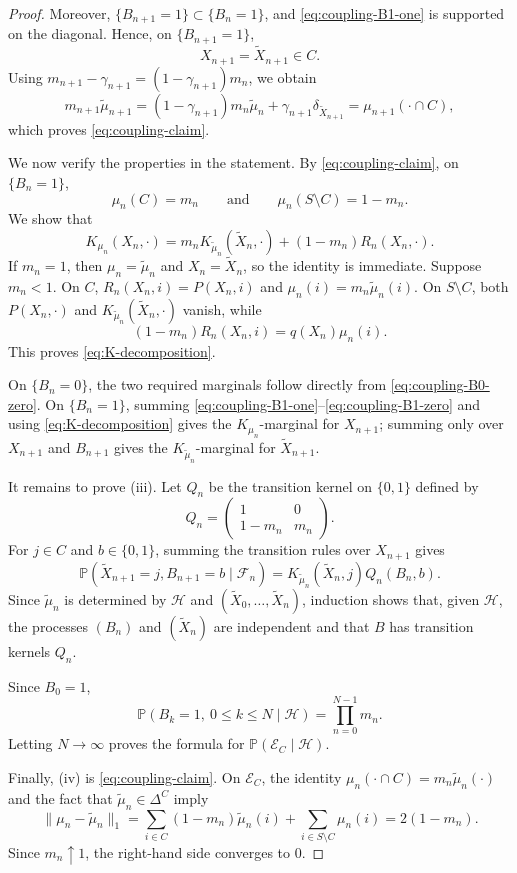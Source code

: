 \documentclass[10pt,letterpaper]{article}
\theoremstyle{compactplain}
\theoremstyle{compactdefinition}
\newcommand{\1}{\mathds{1}}
\begin{document}
\begin{proof}
Moreover,
\(\{B_{n+1}=1\}\subset\{B_n=1\}\), and
\eqref{eq:coupling-B1-one} is supported on the diagonal. Hence, on
\(\{B_{n+1}=1\}\),
\[
X_{n+1}=\widetilde X_{n+1}\in C.
\]
Using
\(m_{n+1}-\gamma_{n+1}=(1-\gamma_{n+1})m_n\), we obtain
\[
m_{n+1}\widetilde\mu_{n+1}
=
(1-\gamma_{n+1})m_n\widetilde\mu_n
+
\gamma_{n+1}\delta_{\widetilde X_{n+1}}
=
\mu_{n+1}(\cdot\cap C),
\] which proves \eqref{eq:coupling-claim}.

We now verify the properties in the statement. By \eqref{eq:coupling-claim}, on \(\{B_n=1\}\),
\[
\mu_n(C)=m_n
\qquad\text{and}\qquad
\mu_n(S\setminus C)=1-m_n.
\]
We show that
\begin{equation}
\label{eq:K-decomposition}
K_{\mu_n}(X_n,\cdot)
=
m_nK_{\widetilde\mu_n}(\widetilde X_n,\cdot)
+
(1-m_n)R_n(X_n,\cdot).
\end{equation}
If \(m_n=1\), then
\(\mu_n=\widetilde\mu_n\) and \(X_n=\widetilde X_n\), so the identity is
immediate. Suppose \(m_n<1\). On \(C\),
\(R_n(X_n,i)=P(X_n,i)\) and
\(\mu_n(i)=m_n\widetilde\mu_n(i)\). On \(S\setminus C\),
both \(P(X_n,\cdot)\) and
\(K_{\widetilde\mu_n}(\widetilde X_n,\cdot)\) vanish, while
\[
(1-m_n)R_n(X_n,i)=q(X_n)\mu_n(i).
\]
This proves \eqref{eq:K-decomposition}.

On \(\{B_n=0\}\), the two required marginals follow directly from
\eqref{eq:coupling-B0-zero}. On \(\{B_n=1\}\), summing
\eqref{eq:coupling-B1-one}--\eqref{eq:coupling-B1-zero} and using
\eqref{eq:K-decomposition} gives the \(K_{\mu_n}\)-marginal for
\(X_{n+1}\); summing only over \(X_{n+1}\) and \(B_{n+1}\) gives the
\(K_{\widetilde\mu_n}\)-marginal for \(\widetilde X_{n+1}\).

It remains to prove (iii). Let \(Q_n\) be the transition kernel on \(\{0,1\}\) defined by
\[
Q_n=
\begin{pmatrix}
1 & 0\\
1-m_n & m_n
\end{pmatrix}.
\]
For \(j\in C\) and \(b\in\{0,1\}\), summing the transition rules over
\(X_{n+1}\) gives
\[
\mathbb P(\widetilde X_{n+1}=j,B_{n+1}=b\mid\mathcal F_n)
=
K_{\widetilde\mu_n}(\widetilde X_n,j)Q_n(B_n,b).
\]
Since \(\widetilde\mu_n\) is determined by \(\mathcal H\) and
\((\widetilde X_0,\ldots,\widetilde X_n)\), induction shows that, given
\(\mathcal H\), the processes \((B_n)\) and \((\widetilde X_n)\) are
independent and that \(B\) has transition kernels \(Q_n\).

Since \(B_0=1\),
\[
\mathbb P(B_k=1,\ 0\leq k\leq N\mid\mathcal H)
=
\prod_{n=0}^{N-1}m_n.
\]
Letting \(N\to\infty\) proves the formula for
\(\mathbb P(\mathcal E_C\mid\mathcal H)\).

Finally, (iv) is \eqref{eq:coupling-claim}. On \(\mathcal E_C\), the identity
\(\mu_n(\cdot\cap C)=m_n\widetilde\mu_n(\cdot)\) and the fact that
\(\widetilde\mu_n\in\Delta^C\) imply
\[
\|\mu_n-\widetilde\mu_n\|_1
=
\sum_{i\in C}(1-m_n)\widetilde\mu_n(i)
+
\sum_{i\in S\setminus C}\mu_n(i)
=
2(1-m_n).
\]
Since \(m_n\uparrow1\), the right-hand side converges to \(0\).
\end{proof}
\end{document}
